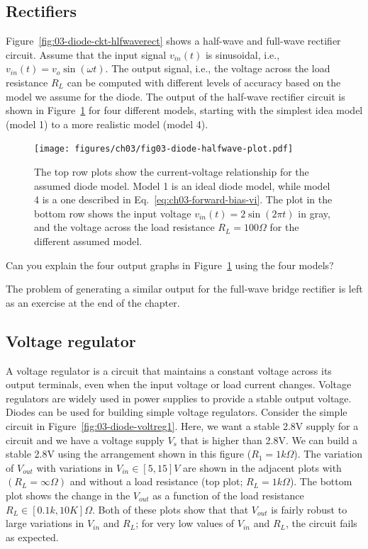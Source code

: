 \subsection{Rectifiers}
Figure~\ref{fig:03-diode-ckt-hlfwaverect} shows a half-wave and full-wave rectifier circuit. Assume that the input signal  $v_{in}\left(t\right)$ is sinusoidal, i.e., $v_{in}\left(t\right) = v_o \sin\left(\omega t\right)$. The output signal, i.e., the voltage across the load resistance $R_L$ can be computed with different levels of accuracy based on the model we assume for the diode. The output of the half-wave rectifier circuit is shown in Figure~\ref{fig:03-diode-halfwave-plot} for four different models, starting with the simplest idea model (model 1) to a more realistic model (model 4). 
\begin{figure}[t]
    \centering
    \texttt{[image: figures/ch03/fig03-diode-halfwave-plot.pdf]}
    \caption{The top row plots show the current-voltage relationship for the assumed diode model. Model 1 is an ideal diode model, while model 4 is a one described in Eq.~\ref{eq:ch03-forward-bias-vi}. The plot in the bottom row shows the input voltage $v_{in}\left(t\right) = 2 \sin\left(2\pi t\right)$ in gray, and the voltage across the load resistance $R_L = 100\Omega$ for the different assumed model.}
    \label{fig:03-diode-halfwave-plot}
\end{figure}

\begin{boxedstuff}
    \begin{problem}
        Can you explain the four output graphs in Figure~\ref{fig:03-diode-halfwave-plot} using the four models?
    \end{problem}
\end{boxedstuff}
The problem of generating a similar output for the full-wave bridge rectifier is left as an exercise at the end of the chapter.

\subsection{Voltage regulator}
A voltage regulator is a circuit that maintains a constant voltage across its output terminals, even when the input voltage or load current changes. Voltage regulators are widely used in power supplies to provide a stable output voltage. Diodes can be used for building simple voltage regulators. Consider the simple circuit in Figure~\ref{fig:03-diode-voltreg1}. Here, we want a stable 2.8V supply for a circuit and we have a voltage supply $V_s$ that is higher than 2.8V. We can build a stable 2.8V using the arrangement shown in this figure ($R_1 = 1k\Omega$). The variation of $V_{out}$ with variations in $V_{in} \in [5, 15]V$ are shown in the adjacent plots with $\left(R_L = \infty \Omega\right)$ and without a load resistance (top plot; $R_L = 1k\Omega$). The bottom plot shows the change in the $V_{out}$ as a function of the load resistance $R_L \in [0.1k, 10K]\Omega$. Both of these plots show that that $V_{out}$ is fairly robust to large variations in $V_{in}$ and $R_L$; for very low values of $V_{in}$ and $R_L$, the circuit fails as expected.


